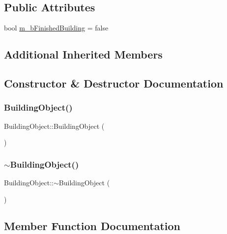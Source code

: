 \subsection*{Public Attributes}
\begin{DoxyCompactItemize}
\item 
bool \mbox{\hyperlink{class_building_object_a2dd2d1f12b504e16b3bce3e8825badb7}{m\+\_\+b\+Finished\+Building}} = false
\end{DoxyCompactItemize}
\subsection*{Additional Inherited Members}


\subsection{Constructor \& Destructor Documentation}
\mbox{\label{class_building_object_aab54197a4f72381251c422e530b5282f}} 
\subsubsection{\texorpdfstring{Building\+Object()}{BuildingObject()}}
{\footnotesize\ttfamily Building\+Object\+::\+Building\+Object (\begin{DoxyParamCaption}{ }\end{DoxyParamCaption})}

\mbox{\label{class_building_object_a0a6779902609501186267d00d363bcde}} 
\subsubsection{\texorpdfstring{$\sim$\+Building\+Object()}{~BuildingObject()}}
{\footnotesize\ttfamily Building\+Object\+::$\sim$\+Building\+Object (\begin{DoxyParamCaption}{ }\end{DoxyParamCaption})}



\subsection{Member Function Documentation}
\mbox{\label{class_building_object_ade01ec444234c24eedc0286b5a7c85eb}} 

